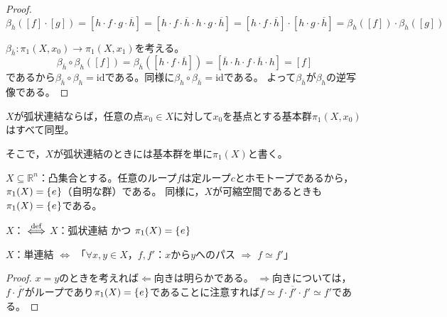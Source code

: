\documentclass[uplatex]{jsarticle}
\begin{document}
\begin{proof}
  \begin{equation}
    \beta_{h}([f] \cdot [g]) = [h \cdot f \cdot g \cdot \overline{h}] = [h \cdot f \cdot \overline{h} \cdot h \cdot g \cdot \overline{h}] = [h \cdot f \cdot \overline{h}] \cdot [h \cdot g \cdot \overline{h}] = \beta_{h}([f]) \cdot \beta_{h}([g])
  \end{equation}

  \sukima {}

  $\beta_{\overline{h}} \colon \pi_{1}(X, x_{0}) \longrightarrow \pi_{1}(X, x_{1})$を考える。
  \begin{equation}
    \beta_{\overline{h}} \circ \beta_{h} ([f]) = \beta_{\overline{h}} ([h \cdot f \cdot \overline{h}]) = [\overline{h} \cdot h \cdot f \cdot \overline{h} \cdot h] = [f]
  \end{equation}
  であるから$\beta_{\overline{h}} \circ \beta_{h} = \mathrm{id}$である。同様に$\beta_{h} \circ \beta_{\overline{h}} = \mathrm{id}$である。
  よって$\beta_{\overline{h}}$が$\beta_{h}$の逆写像である。
\end{proof}

\begin{prop}
  $X$が弧状連結ならば，任意の点$x_{0} \in X$に対して$x_{0}$を基点とする基本群$\pi_{1}(X,x_{0})$はすべて同型。
\end{prop}

そこで，$X$が弧状連結のときには基本群を単に$\pi_{1}(X)$と書く。

\begin{rei}
  $X \subseteq \mathbb{R}^{n}$：凸集合とする。任意のループ$f$は定ループ$c$とホモトープであるから，$\pi_{1}(X) = \Set{\hspace{-1.8pt} e \hspace{-1.8pt}}$（自明な群）である。
  同様に，$X$が可縮空間であるときも$\pi_{1}(X) = \Set{\hspace{-1.8pt} e \hspace{-1.8pt}}$である。
\end{rei}

\begin{teigi}[単連結]
  $X$： $\overset{\mathrm{def}}{\Longleftrightarrow}$ $X$：弧状連結 かつ $\pi_{1}(X) = \Set{\hspace{-1.8pt} e \hspace{-1.8pt}}$
\end{teigi}

\begin{prop}
  $X$：単連結 $\Longleftrightarrow$ 「$\forall x, y \in X$，$f, f'$：$x$から$y$へのパス $\Longrightarrow$ $f \simeq f'$」
\end{prop}

\begin{proof}
  $x = y$のときを考えれば$\Longleftarrow$向きは明らかである。
  $\Longrightarrow$向きについては，$f \cdot \overline{f'}$がループであり$\pi_{1}(X) = \Set{\hspace{-1.8pt} e \hspace{-1.8pt}}$であることに注意すれば$f \simeq f \cdot \overline{f'} \cdot f' \simeq f'$である。 
\end{proof}
\end{document}
